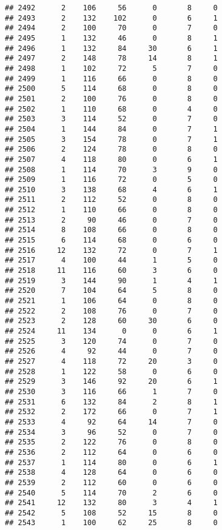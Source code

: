 \documentclass[
]{article}
\begin{document}
\begin{verbatim}
## 2492      2    106     56      0       8     0
## 2493      2    132    102      0       6     1
## 2494      2    100     70      0       7     0
## 2495      1    132     46      0       8     1
## 2496      1    132     84     30       6     1
## 2497      2    148     78     14       8     1
## 2498      1    102     72      5       7     0
## 2499      1    116     66      0       8     0
## 2500      5    114     68      0       8     0
## 2501      2    100     76      0       8     0
## 2502      1    110     68      0       4     0
## 2503      3    114     52      0       7     0
## 2504      1    144     84      0       7     1
## 2505      3    154     78      0       7     1
## 2506      2    124     78      0       8     0
## 2507      4    118     80      0       6     1
## 2508      1    114     70      3       9     0
## 2509      1    116     72      0       5     0
## 2510      3    138     68      4       6     1
## 2511      2    112     52      0       8     0
## 2512      1    110     66      0       8     0
## 2513      2     90     46      0       7     0
## 2514      8    108     66      0       8     0
## 2515      6    114     68      0       6     0
## 2516     12    132     72      0       7     1
## 2517      4    100     44      1       5     0
## 2518     11    116     60      3       6     0
## 2519      3    144     90      1       4     1
## 2520      7    104     64      5       8     0
## 2521      1    106     64      0       8     0
## 2522      2    108     76      0       7     0
## 2523      2    128     60     30       6     0
## 2524     11    134      0      0       6     1
## 2525      3    120     74      0       7     0
## 2526      4     92     44      0       7     0
## 2527      4    118     72     20       3     0
## 2528      1    122     58      0       6     0
## 2529      3    146     92     20       6     1
## 2530      3    116     66      1       7     0
## 2531      6    132     84      2       8     1
## 2532      2    172     66      0       7     1
## 2533      4     92     64     14       7     0
## 2534      3     96     52      0       7     0
## 2535      2    122     76      0       8     0
## 2536      2    112     64      0       6     0
## 2537      1    114     80      0       6     1
## 2538      4    128     64      0       6     0
## 2539      2    112     60      0       6     0
## 2540      5    114     70      2       6     0
## 2541     12    132     80      3       4     1
## 2542      5    108     52     15       8     0
## 2543      1    100     62     25       8     0

\end{verbatim}
\end{document}
